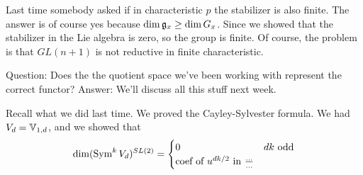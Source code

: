 
Last time somebody asked if in characteristic $p$ the stabilizer is also finite. The answer is of course yes because $\dim \mathfrak{g}_x\ge \dim G_x$. Since we showed that the stabilizer in the Lie algebra is zero, so the group is finite. Of course, the problem is that $GL(n+1)$ is not reductive in finite characteristic.

Question: Does the the quotient space we've been working with represent the correct functor? Answer: We'll discuss all this stuff next week.

Recall what we did last time. We proved the Cayley-Sylvester formula. We had $V_d=\mathbb{V}_{1,d}$, and we showed that
\[
 \dim (\operatorname{Sym}^k V_d)^{SL(2)}=
 \begin{cases}
  0 & dk\text{ odd}\\
  \text{coef of } u^{dk/2}\text{ in } \frac{\dots}{\dots}
 \end{cases}
\]

